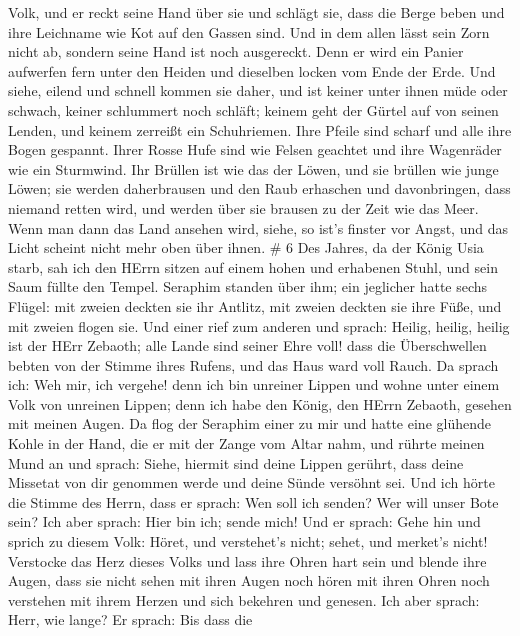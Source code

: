 Volk, und er reckt seine Hand über sie und schlägt sie, dass die Berge
beben und ihre Leichname wie Kot auf den Gassen sind. Und in dem allen
lässt sein Zorn nicht ab, sondern seine Hand ist noch ausgereckt.
 Denn er wird ein Panier aufwerfen fern unter den Heiden
und dieselben locken vom Ende der Erde. Und siehe, eilend und schnell
kommen sie daher,  und ist keiner unter ihnen müde oder
schwach, keiner schlummert noch schläft; keinem geht der Gürtel auf von
seinen Lenden, und keinem zerreißt ein Schuhriemen.  Ihre
Pfeile sind scharf und alle ihre Bogen gespannt. Ihrer Rosse Hufe sind
wie Felsen geachtet und ihre Wagenräder wie ein Sturmwind. 
Ihr Brüllen ist wie das der Löwen, und sie brüllen wie junge Löwen; sie
werden daherbrausen und den Raub erhaschen und davonbringen, dass
niemand retten wird,  und werden über sie brausen zu der
Zeit wie das Meer. Wenn man dann das Land ansehen wird, siehe, so ist's
finster vor Angst, und das Licht scheint nicht mehr oben über ihnen. \#
6  Des Jahres, da der König Usia starb, sah ich den HErrn
sitzen auf einem hohen und erhabenen Stuhl, und sein Saum füllte den
Tempel.  Seraphim standen über ihm; ein jeglicher hatte
sechs Flügel: mit zweien deckten sie ihr Antlitz, mit zweien deckten sie
ihre Füße, und mit zweien flogen sie.  Und einer rief zum
anderen und sprach: Heilig, heilig, heilig ist der HErr Zebaoth; alle
Lande sind seiner Ehre voll!  dass die Überschwellen bebten
von der Stimme ihres Rufens, und das Haus ward voll Rauch. 
Da sprach ich: Weh mir, ich vergehe! denn ich bin unreiner Lippen und
wohne unter einem Volk von unreinen Lippen; denn ich habe den König, den
HErrn Zebaoth, gesehen mit meinen Augen.  Da flog der
Seraphim einer zu mir und hatte eine glühende Kohle in der Hand, die er
mit der Zange vom Altar nahm,  und rührte meinen Mund an und
sprach: Siehe, hiermit sind deine Lippen gerührt, dass deine Missetat
von dir genommen werde und deine Sünde versöhnt sei.  Und
ich hörte die Stimme des Herrn, dass er sprach: Wen soll ich senden? Wer
will unser Bote sein? Ich aber sprach: Hier bin ich; sende mich!
 Und er sprach: Gehe hin und sprich zu diesem Volk: Höret,
und verstehet's nicht; sehet, und merket's nicht! 
Verstocke das Herz dieses Volks und lass ihre Ohren hart sein und blende
ihre Augen, dass sie nicht sehen mit ihren Augen noch hören mit ihren
Ohren noch verstehen mit ihrem Herzen und sich bekehren und genesen.
 Ich aber sprach: Herr, wie lange? Er sprach: Bis dass die
